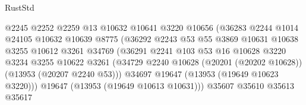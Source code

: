 \begin{lexlean}{RustStd}
\begin{coremodule}
                                        @2245
                                        @2252
                                        @2259
                                        @13
                                        @10632
                                        @10641
                                        @3220
                                        @10656
                                        (@36283
                                          @2244
                                          @1014
                                          @24105
                                          @10632
                                          @10639
                                          @8775
                                          (@36292
                                            @2243
                                            @53
                                            @55
                                            @3869
                                            @10631
                                            @10638
                                            @3255
                                            @10612
                                            @3261
                                            @34769
                                            (@36291
                                              @2241
                                              @103
                                              @53
                                              @16
                                              @10628
                                              @3220
                                              @3234
                                              @3255
                                              @10622
                                              @3261
                                              (@34729
                                                @2240
                                                @10628
                                                (@20201 (@20202 @10628))
                                                (@13953 (@20207 @2240 @53)))
                                              @34697
                                              @19647
                                              (@13953 (@19649 @10623 @3220)))
                                            @19647
                                            (@13953 (@19649 @10613 @10631)))
                                          @35607
                                          @35610
                                          @35613
                                          @35617

\end{coremodule}
\end{lexlean}
